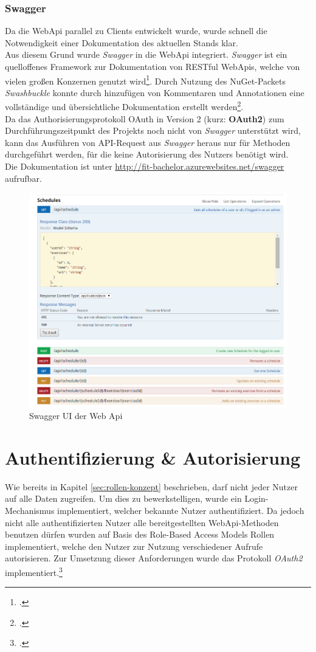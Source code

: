 \subsubsection*{Swagger}
\label{sssec:Swagger}
Da die WebApi parallel zu Clients entwickelt wurde, wurde schnell die Notwendigkeit einer Dokumentation des aktuellen Stands klar. \\
Aus diesem Grund wurde \textit{Swagger} in die WebApi integriert. \textit{Swagger} ist ein quelloffenes Framework zur Dokumentation von \ac{REST}ful WebApis, welche von vielen großen Konzernen genutzt wird\footcite{swagger}. Durch Nutzung des \ac{NuGet}-Packets \textit{Swashbuckle} konnte durch hinzufügen von Kommentaren und Annotationen eine vollständige und übersichtliche Dokumentation erstellt werden\footcite{implementing-Swagger}. \\
Da das Authorisierungsprotokoll OAuth in Version 2 (kurz: \textbf{OAuth2}) zum Durchführungszeitpunkt des Projekts noch nicht von \textit{Swagger} unterstützt wird, kann das Ausführen von API-Request aus \textit{Swagger} heraus nur für Methoden durchgeführt werden, für die keine Autorisierung des Nutzers benötigt wird. \\
Die Dokumentation ist unter \href{http://fit-bachelor.azurewebsites.net/swagger}{http://fit-bachelor.azurewebsites.net/swagger} aufrufbar. 
\begin{figure}[h]
\centering
\includegraphics[width=0.8\linewidth]{content/images/Swagger-UI-fIT}
\caption{Swagger UI der Web Api}
\label{pic:swagger-UI}
\end{figure}


\section{Authentifizierung \& Autorisierung}
\label{sec:server-authorisierung}
Wie bereits in Kapitel \ref{sec:rollen-konzept} beschrieben, darf nicht jeder Nutzer auf alle Daten zugreifen. Um dies zu bewerkstelligen, wurde ein Login-Mechanismus implementiert, welcher bekannte Nutzer authentifiziert. Da jedoch nicht alle authentifizierten Nutzer alle bereitgestellten WebApi-Methoden benutzen dürfen wurden auf Basis des \ac{Role-Based Access Models} Rollen implementiert, welche den Nutzer zur Nutzung verschiedener Aufrufe autorisieren. Zur Umsetzung dieser Anforderungen wurde das Protokoll \textit{OAuth2} implementiert.\footcite{online:WebApi_Authorize}
